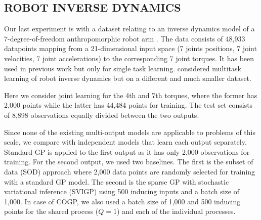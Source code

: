 \subsection{ROBOT INVERSE DYNAMICS}
Our last experiment is with a dataset relating to an inverse dynamics model of a 7-degree-of-freedom anthropomorphic robot arm \citep{vijayakumar2000locally}.
The data consists of 48,933 datapoints mapping from a 21-dimensional input space (7 joints positions, 7 joint velocities, 7 joint accelerations) to the corresponding 7 joint torques.
It has been used in previous work \citep[see e.g.][]{rasmussen-williams-book,vijayakumar2000locally} but only for single task learning. 
\citet{chai2008multi} considered multitask learning of robot inverse dynamics  but on a different and much smaller dataset.

Here we consider joint learning for the 4th and 7th torques, where the former has 2,000 points  
while the latter has  44,484 points for training.
The test set consists of 8,898 observations equally divided between the two outputs.

Since none of the existing multi-output models are applicable to problems of this scale, we compare with independent models that learn each output separately.
Standard GP is applied to the first output as it has only 2,000 observations for training.
For the second output, we used two baselines.
The first is the subset of data (SOD) approach where 2,000 data points are randomly selected for training with a standard GP model.
The second is the sparse GP with stochastic variational inference (SVIGP) using 500 inducing inputs and a batch size of 1,000.
In case of COGP, we also used a batch size of 1,000 and 500 inducing points for the shared process ($Q = 1$) and each of the individual processes.

